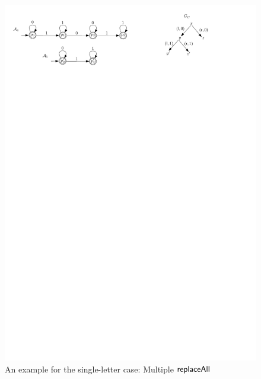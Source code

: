 \begin{example}
\begin{figure}[htbp]
\begin{center}
\includegraphics[scale=0.8]{single-letter-example-nested.pdf}
\end{center}
\caption{An example for the single-letter case: Multiple $\mathsf{replaceAll}$}\label{fig-sl-exmp-nested}
\end{figure}


\end{example}
